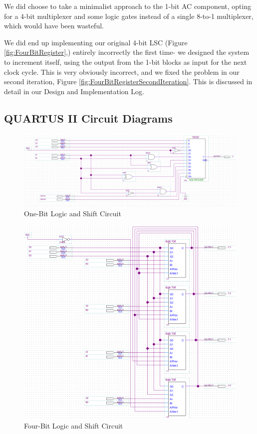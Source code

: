 \documentclass[a4paper,12pt]{article}
\begin{document}
We did choose to take a minimalist approach to the 1-bit AC component, opting for a 4-bit multiplexer and some logic gates instead of a single 8-to-1 multiplexer, which would have been wasteful. 

We did end up implementing our original 4-bit LSC (Figure \ref{fig:FourBitRegister},) entirely incorrectly the first time- we designed the system to increment itself, using the output from the 1-bit blocks as input for the next clock cycle. This is very obviously incorrect, and we fixed the problem in our second iteration, Figure \ref{fig:FourBitRegisterSecondIteration}. This is discussed in detail in our Design and Implementation Log.

\subsection{QUARTUS II Circuit Diagrams}

\begin{figure}[H]
\includegraphics[width=\textwidth]{Diagrams/BlockDiagram_1bitISC.PNG} 
\caption{One-Bit Logic and Shift Circuit}
\label{fig:OneBitISC}
\end{figure}

\begin{figure}[H]
\includegraphics[width=\textwidth]{Diagrams/BlockDiagram_4bitISC.PNG} 
\caption{Four-Bit Logic and Shift Circuit}
\label{fig:FourBitISC}
\end{figure}
\end{document}
